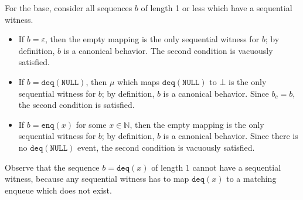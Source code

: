 \documentclass{LMCS}
\newcommand{\NULL}{\ensuremath{\mathtt{NULL}}}
\newcommand{\enq}{\ensuremath{\mathtt{enq}}}
\newcommand{\deq}{\ensuremath{\mathtt{deq}}}
\begin{document}
For the base, consider all sequences $b$ of length 1 or less which have a sequential witness.
\begin{itemize}
\item If $b=\varepsilon$, then the empty mapping is the only sequential witness for $b$; by definition, $b$ is a canonical behavior.
The second condition is vacuously satisfied.
\item If $b=\deq(\NULL)$, then $\mu$ which maps $\deq(\NULL)$ to $\bot$ is the only sequential witness for $b$; by definition, $b$ is a canonical behavior.
Since $b_c=b$, the second condition is satisfied.
\item If $b=\enq(x)$ for some $x\in\mathbb{N}$, then the empty mapping is the only sequential witness for $b$; by definition, $b$ is a canonical behavior.
Since there is no $\deq(\NULL)$ event, the second condition is vacuously satisfied.
\end{itemize}
Observe that the sequence $b=\deq(x)$ of length 1 cannot have a sequential witness, because any sequential witness has to map $\deq(x)$ to a matching enqueue which does not exist.
\end{document}
